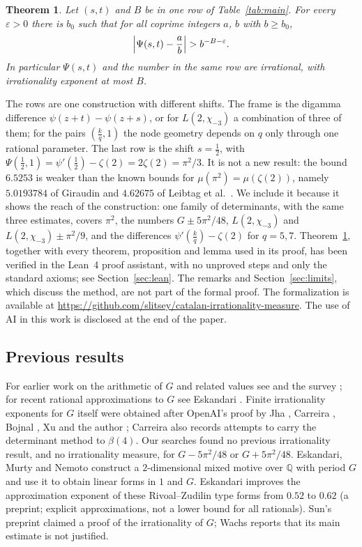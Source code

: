 \documentclass[11pt]{amsart}
\newcommand{\FormalizationURL}{https://github.com/slitsey/catalan-irrationality-measure}
\newcommand{\FormalizationLink}{\url{\FormalizationURL}}
\newtheorem{theorem}{Theorem}[section]
\theoremstyle{definition}
\theoremstyle{remark}
\numberwithin{equation}{section}
\newcommand{\Q}{\mathbb Q}
\newcommand{\MuHalvesU}{6.5253}
\begin{document}
\begin{theorem}\label{thm:main}\label{thm:thirds}\label{thm:fifths}
Let $(s,t)$ and $B$ be in one row of Table~\ref{tab:main}. For every $\varepsilon>0$ there is $b_0$ such
that for all coprime integers $a$, $b$ with $b\ge b_0$,
\[
 \Bigl|\Psi(s,t)-\frac ab\Bigr|>b^{-B-\varepsilon}.
\]
In particular $\Psi(s,t)$ and the number in the same row are irrational, with irrationality exponent at
most $B$.
\end{theorem}

The rows are one construction with different shifts. The frame is the digamma difference
$\psi(z+t)-\psi(z+s)$, or for $L(2,\chi_{-3})$ a combination of three of them; for the pairs
$(\frac kq,1)$ the node geometry depends on $q$ only through one rational parameter. The last row is the shift
$s=\frac12$, with $\Psi(\frac12,1)=\psi'(\frac12)-\zeta(2)=2\zeta(2)=\pi^2/3$. It is not a new result: the bound
$\MuHalvesU$ is weaker than the known bounds for $\mu(\pi^2)=\mu(\zeta(2))$, namely $5.0193784$ of Giraudin
\cite{Giraudin26} and $4.62675$ of Leibtag et al.\ \cite{LBKWSK26}. We include it because it shows the reach of the
construction: one family of determinants, with the same three estimates, covers $\pi^2$, the numbers $G\pm5\pi^2/48$,
$L(2,\chi_{-3})$ and $L(2,\chi_{-3})\pm\pi^2/9$, and the differences $\psi'(\frac kq)-\zeta(2)$ for $q=5,7$.
Theorem~\ref{thm:main}, together with every theorem, proposition and
lemma used in its proof, has been verified in the Lean~4 proof assistant, with no unproved steps and only the standard
axioms; see Section~\ref{sec:lean}. The remarks and Section~\ref{sec:limits}, which discuss the method, are not part of the
formal proof. The formalization is available at \FormalizationLink. The use of AI
in this work is disclosed at the end of the paper.

\subsection{Previous results}
For earlier work on the arithmetic of $G$ and related values see
\cite{RivoalZudilin2003,Zudilin2003,Zudilin02Cheb,KrattRivoal08,KrattZudilin19} and the survey
\cite{Zudilin19Survey}; for recent rational approximations to $G$ see Eskandari \cite{Eskandari2026}. Finite
irrationality exponents for $G$ itself were obtained after OpenAI's proof by Jha \cite{Jha2026}, Carreira
\cite{Carreira2026}, Bojnal \cite{Bojnal2026}, Xu \cite{Xu2026} and the author \cite{Litsey2026}; Carreira \cite{Carreira2026b} also records attempts to carry the
determinant method to $\beta(4)$. Our searches found no previous irrationality result, and no irrationality measure, for $G-5\pi^2/48$ or $G+5\pi^2/48$.
Eskandari, Murty and Nemoto \cite{EMN2025} construct a $2$-dimensional mixed motive over $\Q$ with period $G$ and
use it to obtain linear forms in $1$ and $G$. Eskandari \cite{Eskandari2026} improves the approximation exponent of these
Rivoal--Zudilin type forms from $0.52$ to $0.62$ (a preprint; explicit approximations, not a lower bound for all
rationals). Sun's preprint \cite{Sun2026} claimed a proof of the irrationality of $G$; Wachs \cite{Wachs2026} reports that
its main estimate is not justified.
\end{document}
